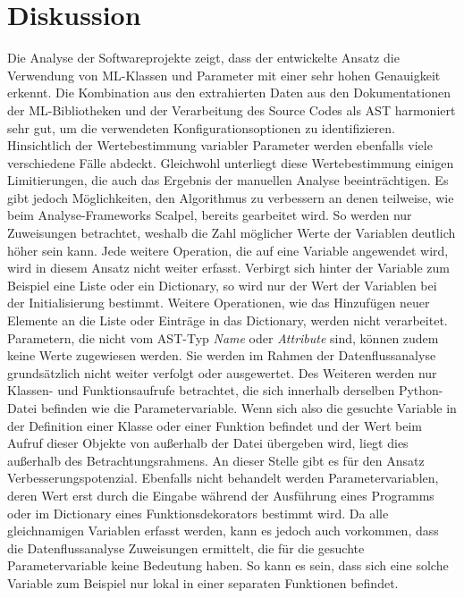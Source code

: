 \documentclass[german,bachelor]{swsLeipzig}
\begin{document}
\section{Diskussion}
Die Analyse der Softwareprojekte zeigt, dass der entwickelte Ansatz die Verwendung von ML-Klassen und Parameter
mit einer sehr hohen Genauigkeit erkennt.
Die Kombination aus den extrahierten Daten aus den Dokumentationen der ML-Bibliotheken und der Verarbeitung des Source Codes als AST
harmoniert sehr gut, um die verwendeten Konfigurationsoptionen zu identifizieren.\\
\indent Hinsichtlich der Wertebestimmung variabler Parameter werden ebenfalls viele verschiedene Fälle abdeckt.
Gleichwohl unterliegt diese Wertebestimmung einigen Limitierungen, die auch das Ergebnis der manuellen Analyse beeinträchtigen.
Es gibt jedoch Möglichkeiten, den Algorithmus zu verbessern an denen teilweise, wie beim
Analyse-Frameworks Scalpel, bereits gearbeitet wird.
So werden nur Zuweisungen betrachtet, weshalb die Zahl möglicher Werte der Variablen deutlich höher sein kann.
Jede weitere Operation, die auf eine Variable angewendet wird, wird in diesem Ansatz nicht weiter erfasst.
Verbirgt sich hinter der Variable zum Beispiel eine Liste oder ein Dictionary, so wird nur der Wert der Variablen bei der
Initialisierung bestimmt.
Weitere Operationen, wie das Hinzufügen neuer Elemente an die Liste oder Einträge in das Dictionary,
werden nicht verarbeitet.\\
\indent Parametern, die nicht vom AST-Typ \textit{Name} oder \textit{Attribute} sind, können zudem keine Werte zugewiesen werden.
Sie werden im Rahmen der Datenflussanalyse grundsätzlich nicht weiter verfolgt oder ausgewertet.
Des Weiteren werden nur Klassen- und Funktionsaufrufe betrachtet, die sich innerhalb derselben Python-Datei befinden wie die Parametervariable.
Wenn sich also die gesuchte Variable in der Definition einer Klasse oder einer Funktion befindet und der Wert beim Aufruf
dieser Objekte von außerhalb der Datei übergeben wird, liegt dies außerhalb des Betrachtungsrahmens.
An dieser Stelle gibt es für den Ansatz Verbesserungspotenzial.
Ebenfalls nicht behandelt werden Parametervariablen, deren Wert erst durch die Eingabe während der Ausführung eines Programms
oder im Dictionary eines Funktionsdekorators bestimmt wird.
Da alle gleichnamigen Variablen erfasst werden, kann es jedoch auch vorkommen, dass die Datenflussanalyse
Zuweisungen ermittelt, die für die gesuchte Parametervariable keine Bedeutung haben.
So kann es sein, dass sich eine solche Variable zum Beispiel nur lokal in einer separaten Funktionen befindet.\\
\end{document}
